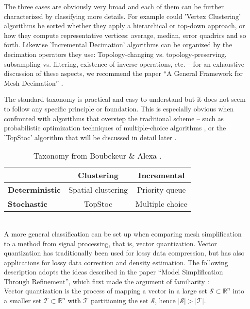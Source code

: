 The three cases are obviously very broad and each of them can be further characterized by classifying more details.
For example could 'Vertex Clustering' algorithms be sorted whether they apply a hierarchical or top-down approach, or how they compute representative vertices: average, median, error quadrics and so forth.
Likewise 'Incremental Decimation' algorithms can be organized by the decimation operators they use: Topology-changing vs. topology-preserving, subsampling vs. filtering, existence of inverse operations, etc. -- for an exhaustive discussion of these aspects, we recommend the paper ``A General Framework for Mesh Decimation'' \citep[cf.][]{Kobbelt1998}.

The standard taxonomy is practical and easy to understand but it does not seem to follow any specific principle or foundation.
This is especially obvious when confronted with algorithms that overstep the traditional scheme -- such as probabilistic optimization techniques of multiple-choice algorithms \citep[cf.][]{Wu2002}, or the 'TopStoc' algorithm that will be discussed in detail later \citep[][cf.]{Boubekeur2009}.
\begin{table}[htpb]
\medskip
\setlength{\tabcolsep}{15pt}
\renewcommand{\arraystretch}{1.5}
   \centering
\begin{tabular}{ l || c | c } \centering
    & \textbf{Clustering} & \textbf{Incremental} \\ \hline \hline
  \textbf{Deterministic} & Spatial clustering & Priority queue \\
  \textbf{Stochastic} & TopStoc & Multiple choice \\
\end{tabular}
   \label{tab:taxonomies} \medskip
   \caption{Taxonomy from Boubekeur \& Alexa \citep[p.2]{Boubekeur2009}.}
\end{table}\\
A more general classification can be set up when comparing mesh simplification to a method from signal processing, that is, vector quantization.
Vector quantization has traditionally been used for lossy data compression, but has also applications for lossy data correction and density estimation.
The following description adopts the ideas described in the paper ``Model Simplification Through Refinement'', which first made the argument of familiarity \citep[][cf. pp.221-222]{Brodsky2000}:\\
Vector quantization is the process of mapping a vector in a large set $\mathcal{S} \subset \mathbb{R}^{n}$ into a smaller set $\mathcal{T} \subset \mathbb{R}^{n}$ with $\mathcal{T}$ partitioning the set $\mathcal{S}$, hence $|\mathcal{S}| > |\mathcal{T}|$.
